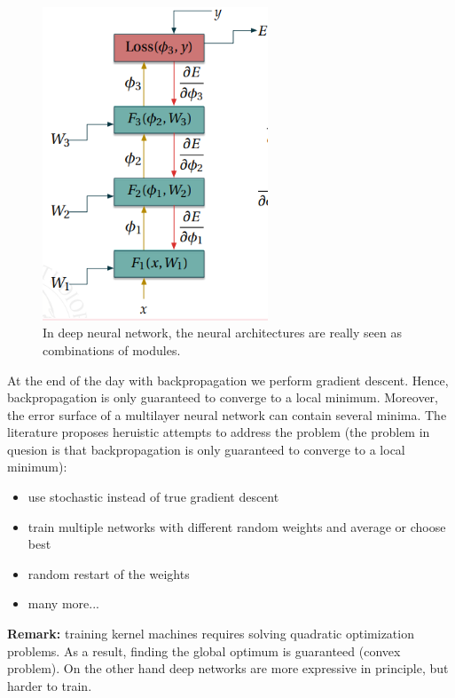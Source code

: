 \begin{figure}
    \centering
    \includegraphics[width=0.6\textwidth]{images/deep_modules.png}
    \caption{In deep neural network, the neural architectures are really seen as combinations of modules.}
    \label{fig:deep_architectures:modular structure}
\end{figure}

At the end of the day with backpropagation we perform gradient descent. Hence, backpropagation is only guaranteed to converge to a local minimum. Moreover, the error surface of a multilayer neural network can contain several minima. The literature proposes heruistic attempts to address the problem (the problem in quesion is that backpropagation is only guaranteed to converge to a local minimum):
\begin{itemize}
    \item use stochastic instead of true gradient descent
    \item train multiple networks with different random weights and average or choose best
    \item random restart of the weights
    \item many more...
\end{itemize}

\textbf{Remark:} training kernel machines requires solving quadratic optimization problems. As a result, finding the global optimum is guaranteed (convex problem). On the other hand deep networks are more expressive in principle, but harder to train.

